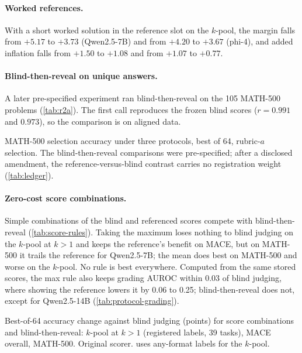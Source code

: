 \paragraph{Worked references.}
With a short worked solution in the reference slot on the $k$-pool, the margin falls from $+5.17$ to $+3.73$ (Qwen2.5-7B) and from $+4.20$ to $+3.67$ (phi-4), and added inflation falls from $+1.50$ to $+1.08$ and from $+1.07$ to $+0.77$.

\paragraph{Blind-then-reveal on unique answers.}
A later pre-specified experiment ran blind-then-reveal on the 105 MATH-500 problems (\cref{tab:r2a}). The first call reproduces the frozen blind scores ($r=0.991$ and $0.973$), so the comparison is on aligned data.

\begin{table}[htbp]
\centering
\caption{MATH-500 selection accuracy under three protocols, best of 64, rubric-$a$ selection. The blind-then-reveal comparisons were pre-specified; after a disclosed amendment, the reference-versus-blind contrast carries no registration weight (\cref{tab:ledger}).}
\label{tab:r2a}
\footnotesize
\begin{adjustbox}{max width=\linewidth}\end{adjustbox}

\end{table}

\paragraph{Zero-cost score combinations.}
Simple combinations of the blind and referenced scores compete with blind-then-reveal (\cref{tab:score-rules}). Taking the maximum loses nothing to blind judging on the $k$-pool at $k{>}1$ and keeps the reference's benefit on \textsc{MACE}, but on MATH-500 it trails the reference for Qwen2.5-7B; the mean does best on MATH-500 and worse on the $k$-pool. No rule is best everywhere. Computed from the same stored scores, the max rule also keeps grading AUROC within 0.03 of blind judging, where showing the reference lowers it by 0.06 to 0.25; blind-then-reveal does not, except for Qwen2.5-14B (\cref{tab:protocol-grading}).\ph

\begin{table}[htbp]
\centering
\footnotesize
\caption{Best-of-64 accuracy change against blind judging (points) for score combinations and blind-then-reveal: $k$-pool at $k{>}1$ (registered labels, 39 tasks), \textsc{MACE} overall, MATH-500. Original scorer.  uses any-format labels for the $k$-pool.\ph}
\label{tab:score-rules}
\begin{adjustbox}{max width=\linewidth}\end{adjustbox}
\end{table}

